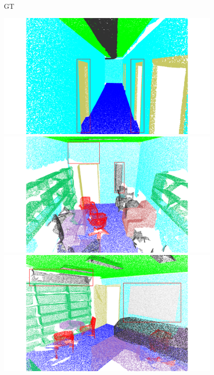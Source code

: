 \begin{figure}[htbp]
    \begin{minipage}{0.1\textwidth}
        \centering
        GT
    \end{minipage}
    \hfill
    \begin{minipage}{0.22\textwidth}
        \centering
        \includegraphics[width=\textwidth]{fig/supplement/semantic_segmentation/hallway_10/GT_hallway_10.pdf}
    \end{minipage}
    \hfill
    \begin{minipage}{0.22\textwidth}
        \centering
        \includegraphics[width=\textwidth]{fig/supplement/semantic_segmentation/office_9/GT_office_9.pdf}
    \end{minipage}
    \hfill
    \begin{minipage}{0.22\textwidth}
        \centering
        \includegraphics[width=\textwidth]{fig/supplement/semantic_segmentation/office_35/GT_office_35.pdf}

\end{minipage}
\end{figure}
